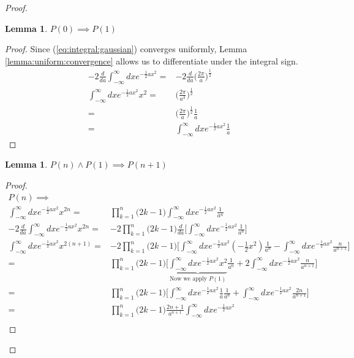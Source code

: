 \documentclass[]{article}
\newtheorem{lemma}[thm]{Lemma}
\begin{document}
\begin{proof}
	\begin{lemma}\label{thm:P_1}
		$P(0) \implies P(1)$
	\end{lemma}
	\begin{proof}
		Since (\ref{eq:integral:gaussian}) converges uniformly, Lemma \ref{lemma:uniform:convergence} allows us to differentiate under the integral sign\cite{widder1961advanced}.
		\begin{align*}
			-2\frac{d}{da}\int_{-\infty}^{\infty} dx e^{-\frac{1}{2}ax^2} =& -2\frac{d}{da} \bigg(\frac{2\pi}{a}\bigg)^\frac{1}{2}\\
			\int_{-\infty}^{\infty} dx e^{-\frac{1}{2}ax^2} x^2 =& \bigg(\frac{2\pi}{a^3}\bigg)^\frac{1}{2}\\
			=& \bigg(\frac{2\pi}{a}\bigg)^\frac{1}{2} \frac{1}{a}\\
			=& \int_{-\infty}^{\infty} dx e^{-\frac{1}{2}ax^2} \frac{1}{a}
		\end{align*}
	\end{proof}
	\begin{lemma}\label{thm:P_n}
		$P(n) \land P(1)\implies P(n+1)$
	\end{lemma}
	\begin{proof}
		\begin{align*}
		P(n) \implies &\\
		\int_{-\infty}^\infty dx e^{-\frac{1}{2}ax^2}x^{2n}=&\prod_{k=1}^{n}\big(2k-1\big)	\int_{-\infty}^\infty dx e^{-\frac{1}{2}ax^2} \frac{1}{a^n}\\
		-2\frac{d}{da}\int_{-\infty}^\infty dx e^{-\frac{1}{2}ax^2}x^{2n}=&-2 \prod_{k=1}^{n}\big(2k-1\big)\frac{d}{da} \big[	\int_{-\infty}^\infty dx e^{-\frac{1}{2}ax^2} \frac{1}{a^n}\big]\\
		\int_{-\infty}^\infty dx e^{-\frac{1}{2}ax^2}x^{2(n+1)}=&-2 \prod_{k=1}^{n}\big(2k-1\big)\bigg[\int_{-\infty}^{\infty} dx e^{-\frac{1}{2}ax^2} (-\frac{1}{2}x^2)\frac{1}{a^n}-\int_{-\infty}^{\infty} dx e^{-\frac{1}{2}ax^2}\frac{n}{a^{n+1}}\bigg] \\
		=&\prod_{k=1}^{n}\big(2k-1\big)\bigg[\underbrace{\int_{-\infty}^{\infty} dx e^{-\frac{1}{2}ax^2}x^2}_\text{Now we apply $P(1)$} \frac{1}{a^n}+2\int_{-\infty}^{\infty} dx e^{-\frac{1}{2}ax^2}\frac{n}{a^{n+1}}\bigg]\\
		=&\prod_{k=1}^{n}\big(2k-1\big)\bigg[ \int_{-\infty}^{\infty} dx e^{-\frac{1}{2}ax^2}\frac{1}{a} \frac{1}{a^n} + \int_{-\infty}^{\infty} dx e^{-\frac{1}{2}ax^2} \frac{2n}{a^{n+1}}\bigg]\\
		=&\prod_{k=1}^{n}\big(2k-1\big) \frac{2n+1}{a^{n+1}}\int_{-\infty}^{\infty} dx e^{-\frac{1}{2}ax^2}\\

\end{align*}
\end{proof}
\end{proof}
\end{document}
